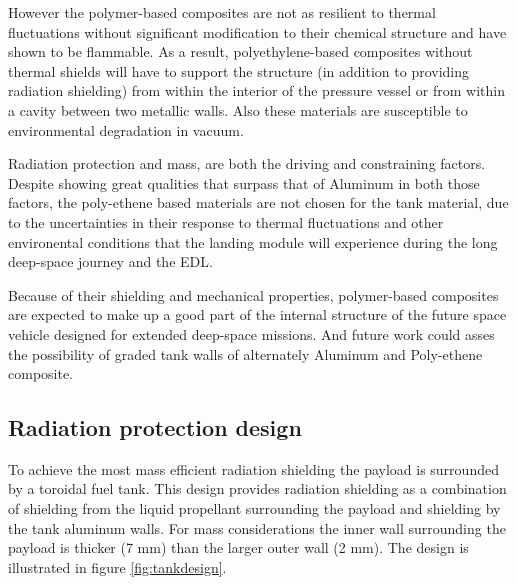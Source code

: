 However the polymer-based composites are not as resilient to thermal fluctuations without significant modification
to their chemical structure and have shown to be flammable. As a result, polyethylene-based composites without thermal shields will have to support the structure (in addition to providing radiation shielding) from within the interior of
the pressure vessel or from within a cavity between two metallic walls. Also these materials are susceptible to environmental degradation in vacuum. 
 

Radiation protection and mass, are both the driving and constraining factors. Despite showing great qualities that surpass that of Aluminum in both those factors, the poly-ethene based materials are not chosen for the tank material, due to the uncertainties in their response to thermal fluctuations and other environental conditions that the landing module will experience during the long deep-space journey and the EDL. 


Because of their shielding and mechanical properties, polymer-based composites
are expected to make up a good part of the internal structure of the future space vehicle designed for
extended deep-space missions\cite{rad_shield_2006}. And future work could asses the possibility of graded tank walls of alternately Aluminum and Poly-ethene composite. 


\subsection{Radiation protection design}
To achieve the most mass efficient radiation shielding the payload is surrounded by a toroidal fuel tank. This design provides radiation shielding as a combination of shielding from the liquid propellant surrounding the payload and shielding by the tank aluminum walls. For mass considerations the inner wall surrounding the payload is thicker (7 mm) than the larger outer wall (2 mm). The design is illustrated in figure \ref{fig:tankdesign}.

